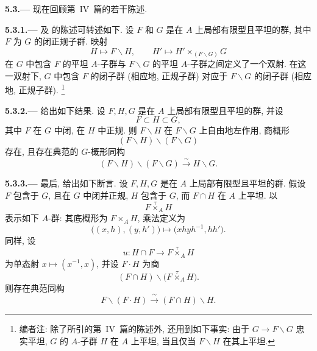
\medskip
{}\label{par:sga3-VIA-5.3}%
\noindent\textbf{5.3.---}
现在回顾第~IV~篇的若干陈述.

\medskip
{}\label{par:sga3-VIA-5.3.1}%
\noindent\textbf{5.3.1.---}
及  的陈述可转述如下.
设 \(F\) 和 \(G\) 是在 \(A\) 上局部有限型且平坦的群,
其中 \(F\) 为 \(G\) 的闭正规子群. 映射
\[
  H\longmapsto F\backslash H,
  \qquad
  H'\longmapsto H'\times_{(F\backslash G)}G
\]
在 \(G\) 中包含 \(F\) 的平坦 \(A\)-子群与 \(F\backslash G\) 的平坦
\(A\)-子群之间定义了一个双射.
在这一双射下, \(G\) 中包含 \(F\) 的闭子群 (相应地, 正规子群)
对应于 \(F\backslash G\) 的闭子群 (相应地, 正规子群).%
\footnote{\label{note:sga3-VIA-52}编者注: 除了所引的第~IV~篇的陈述外,
还用到如下事实: 由于 \(G\to F\backslash G\) 忠实平坦,
\(G\) 的 \(A\)-子群 \(H\) 在 \(A\) 上平坦,
当且仅当 \(F\backslash H\) 在其上平坦.}

\medskip
{}\label{par:sga3-VIA-5.3.2}%
\noindent\textbf{5.3.2.---}
 给出如下结果.
设 \(F,H,G\) 是在 \(A\) 上局部有限型且平坦的群, 并设
\[
  F\subset H\subset G,
\]
其中 \(F\) 在 \(G\) 中闭, 在 \(H\) 中正规.
则 \(F\backslash H\) 在 \(F\backslash G\) 上自由地左作用, 商概形
\[
  (F\backslash H)\backslash(F\backslash G)
\]
存在, 且存在典范的 \(G\)-概形同构
\[
  (F\backslash H)\backslash(F\backslash G)
    \xrightarrow{\ \sim\ }
  H\backslash G.
\]

\medskip
{}\label{par:sga3-VIA-5.3.3}%
\noindent\textbf{5.3.3.---}
最后,  给出如下断言.
设 \(F,H,G\) 是在 \(A\) 上局部有限型且平坦的群.
假设 \(F\) 包含于 \(G\), 且在 \(G\) 中闭并正规,
\(H\) 包含于 \(G\), 而 \(F\cap H\) 在 \(A\) 上平坦. 以
\[
  F\mathbin{\overset{\tau}{\times}}_A H
\]
表示如下 \(A\)-群: 其底概形为 \(F\times_AH\), 乘法定义为
\[
  \bigl((x,h),(y,h')\bigr)
    \longmapsto
  \bigl(xhyh^{-1},hh'\bigr).
\]
同样, 设
\[
  u:H\cap F\longrightarrow
    F\mathbin{\overset{\tau}{\times}}_A H
\]
为单态射 \(x\mapsto(x^{-1},x)\), 并设 \(F\cdot H\) 为商
\[
  (F\cap H)\backslash
    \bigl(F\mathbin{\overset{\tau}{\times}}_A H\bigr).
\]
则存在典范同构
\[
  F\backslash(F\cdot H)
    \xrightarrow{\ \sim\ }
  (F\cap H)\backslash H.
\]
